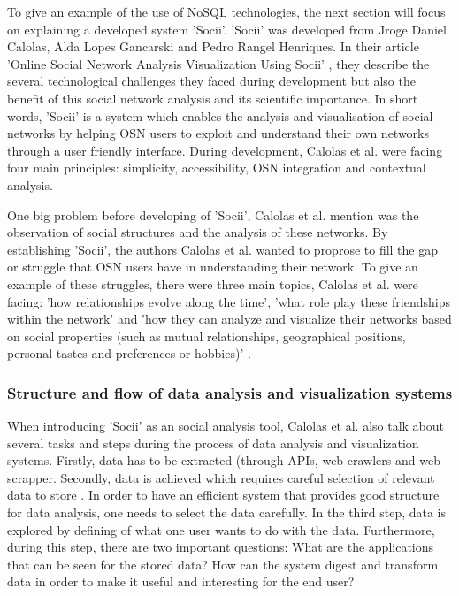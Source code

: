 To give an example of the use of NoSQL technologies, the next section will focus on explaining a developed system 'Socii'. 'Socii' was developed from Jroge Daniel Calolas, Alda Lopes Gancarski and Pedro Rangel Henriques. In their article 'Online Social Network Analysis Visualization Using Socii' \cite[p.218-228]{trends_nosql}, they describe the several technological challenges they faced during development but also the benefit of this social network analysis and its scientific importance. In short words, 'Socii' is a system which enables the analysis and visualisation of social networks by helping \ac{OSN} users to exploit and understand their own networks through a user friendly interface. During development, Calolas et al. were facing four main principles: simplicity, accessibility, OSN integration and contextual analysis.

One big problem before developing of 'Socii', Calolas et al. mention was the observation of social structures and the analysis of these networks. By establishing 'Socii', the authors Calolas et al. wanted to proprose to fill the gap or struggle that OSN users have in understanding their network. To give an example of these struggles, there were three main topics, Calolas et al. were facing: 'how relationships evolve along the time', 'what role play these friendships within the network' and 'how they can analyze and visualize their networks based on social properties (such as mutual relationships, geographical positions, personal tastes and preferences or hobbies)' \cite{trends_nosql}. 

\subsubsection{Structure and flow of data analysis and visualization systems}

When introducing 'Socii' as an social analysis tool, Calolas et al. also talk about several tasks and steps during the process of data analysis and visualization systems. Firstly, data has to be extracted (through APIs, web crawlers and web scrapper. Secondly, data is achieved which requires careful selection of relevant data to store \cite{trends_nosql}. In order to have an efficient system that provides good structure for data analysis, one needs to select the data carefully. In the third step, data is explored by defining of what one user wants to do with the data. Furthermore, during this step, there are two important questions: What are the applications that can be seen for the stored data? How can the system digest and transform data in order to make it useful and interesting for the end user? 

